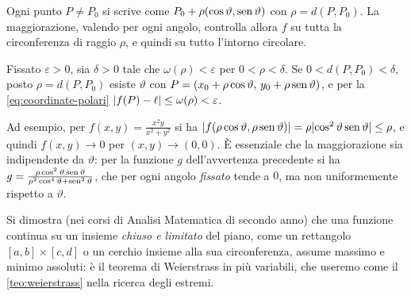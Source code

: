 \begin{schema}
\end{schema}

\begin{strategia}
Ogni punto $P\neq P_{0}$ si scrive come $P_{0}+\rho(\cos\vartheta,\operatorname{sen}\vartheta)$ con
$\rho=d(P,P_{0})$. La maggiorazione, valendo per ogni angolo, controlla allora $f$ su
tutta la circonferenza di raggio $\rho$, e quindi su tutto l'intorno circolare.
\end{strategia}

\begin{dimostrazione}
Fissato $\varepsilon>0$, sia $\delta>0$ tale che $\omega(\rho)<\varepsilon$ per $0<\rho<\delta$.
Se $0<d(P,P_{0})<\delta$, posto $\rho=d(P,P_{0})$ esiste $\vartheta$ con
$P=(x_{0}+\rho\cos\vartheta,\,y_{0}+\rho\operatorname{sen}\vartheta)$, e per la \eqref{eq:coordinate-polari}
$\lvert f(P)-\ell\rvert\le\omega(\rho)<\varepsilon$.
\end{dimostrazione}

Ad esempio, per $f(x,y)=\frac{x^{2}y}{x^{2}+y^{2}}$ si ha
$\lvert f(\rho\cos\vartheta,\rho\operatorname{sen}\vartheta)\rvert=\rho\lvert \cos^{2}\vartheta\operatorname{sen}\vartheta\rvert\le\rho$, e
quindi $f(x,y)\to0$ per $(x,y)\to(0,0)$. È essenziale che la maggiorazione sia
indipendente da $\vartheta$: per la funzione $g$ dell'avvertenza precedente si ha
$g=\frac{\rho\cos^{2}\vartheta\operatorname{sen}\vartheta}{\rho^{2}\cos^{4}\vartheta+\operatorname{sen}^{2}\vartheta}$, che
per ogni angolo \emph{fissato} tende a $0$, ma non uniformemente rispetto a $\vartheta$.

\begin{osservazione}\label{oss:weierstrass-piano}
Si dimostra (nei corsi di Analisi Matematica di secondo anno) che una funzione continua
su un insieme \emph{chiuso e limitato} del piano, come un rettangolo
$[a,b]\times[c,d]$ o un cerchio insieme alla sua circonferenza, assume massimo e minimo
assoluti: è il teorema di Weierstrass in più variabili, che useremo come il
\cref{teo:weierstrass} nella ricerca degli estremi.
\end{osservazione}

